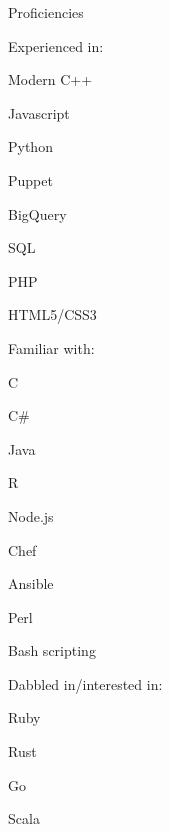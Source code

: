 \documentclass[letterpaper,12pt]{article}
\begin{document}
\begin{paracol}{2}
\rmfamily
\begin{res_section}{Proficiencies}
\begin{res_subsection}{Experienced in:}
  \rmfamily
   \item Modern C++
   \item Javascript
   \item Python
   \item Puppet
   \item BigQuery
   \item SQL
   \item PHP
   \item HTML5/CSS3
\end{res_subsection}
\begin{res_subsection}{Familiar with:}
   \item C
   \item C\#
   \item Java
   \item R
   \item Node.js
   \item Chef
   \item Ansible
   \item Perl
   \item Bash scripting
\end{res_subsection}
\begin{res_subsection}{Dabbled in/interested in:}
   \item Ruby
   \item Rust
   \item Go
   \item Scala

\end{res_subsection}
\end{res_section}
\end{paracol}
\end{document}
